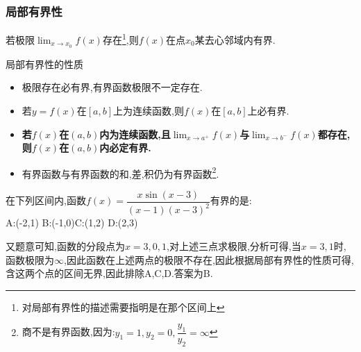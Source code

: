\documentclass[12pt, a4paper, oneside, UTF8]{ctexbook}
\begin{document}
\begin{sloppypar}
    \subsubsection{局部有界性}
    \begin{them}{}{}
        若极限$\lim_{x \to x_0}f(x)$存在\footnote{对局部有界性的描述需要指明是在那个区间上},则$f(x)$在点$x_0$某去心邻域内有界.
    \end{them}
    \begin{criterion}{局部有界性的性质}{}
        \begin{itemize}
            \item 极限存在必有界,有界函数极限不一定存在.
            \item 若$y=f(x)$在$[a,b]$上为连续函数,则$f(x)$在$[a,b]$上必有界.
            \item \textbf{若$f(x)$在$(a,b)$内为连续函数,且$\lim_{x \to a^+}f(x)$与$\lim_{x\to b^-}f(x)$都存在,则$f(x)$在$(a,b)$内必定有界.}
            \item 有界函数与有界函数的和,差,积仍为有界函数\footnote{商不是有界函数,因为:$y_1=1,y_2=0,\dfrac{y_1}{y_2}=\infty$}.
        \end{itemize}
    \end{criterion}
    \begin{problem}
    在下列区间内,函数$f(x)={\dfrac{x\sin(x-3)}{(x-1)(x-3)^{2}}}$有界的是:\\
    A:(-2,1) \qquad  B:(-1,0)\qquad C:(1,2) \qquad D:(2,3)
    \end{problem}
    \begin{solution}
        又题意可知,函数的分段点为$x=3,0,1$,对上述三点求极限,分析可得,当$x=3,1$时,函数极限为$\infty$,因此函数在上述两点的极限不存在,因此根据局部有界性的性质可得,含这两个点的区间无界,因此排除A,C,D.答案为B.
    \end{solution}

\end{sloppypar}
\end{document}
